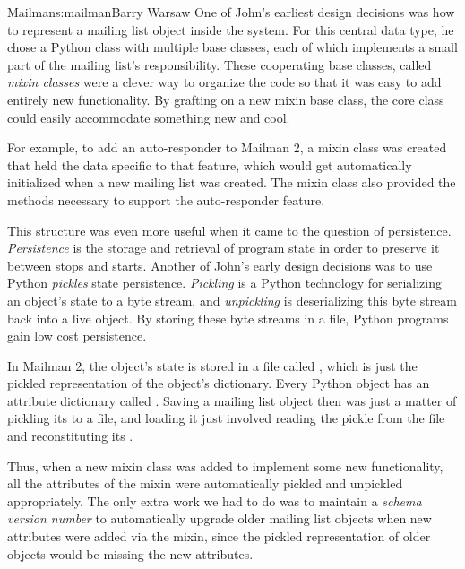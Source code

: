 \begin{aosachapter}{Mailman}{s:mailman}{Barry Warsaw}
One of John's earliest design decisions was how to represent a mailing list
object inside the system.  For this central data type, he chose a Python class
with multiple base classes, each of which implements a small part of the
mailing list's responsibility.  These cooperating base classes, called \emph{mixin
classes} were a clever way to organize the code so that it was easy to add
entirely new functionality.  By grafting on a new mixin base class, the core
 class could easily accommodate something new and cool.

For example, to add an auto-responder to Mailman 2, a mixin class was created
that held the data specific to that feature, which would get automatically
initialized when a new mailing list was created.  The mixin class also
provided the methods necessary to support the auto-responder feature.

This structure was even more useful when it came to the question of
persistence.  \emph{Persistence} is the storage and retrieval of program state in
order to preserve it between stops and starts.  Another of John's early design
decisions was to use Python \emph{pickles}  state persistence.
\emph{Pickling} is a Python technology for serializing an object's state to a byte
stream, and \emph{unpickling} is deserializing this byte stream back into a live
object.  By storing these byte streams in a file, Python programs gain low
cost persistence.

In Mailman 2, the  object's state is stored in a file called
, which is just the pickled representation of the 
object's dictionary.  Every Python object has an attribute dictionary called
.  Saving a mailing list object then was just a matter of pickling
its  to a file, and loading it just involved reading the pickle
from the file and reconstituting its .

Thus, when a new mixin class was added to implement some new functionality,
all the attributes of the mixin were automatically pickled and unpickled
appropriately.  The only extra work we had to do was to maintain a \emph{schema
version number} to automatically upgrade older mailing list objects when new
attributes were added via the mixin, since the pickled representation of older
 objects would be missing the new attributes.


\end{aosachapter}
